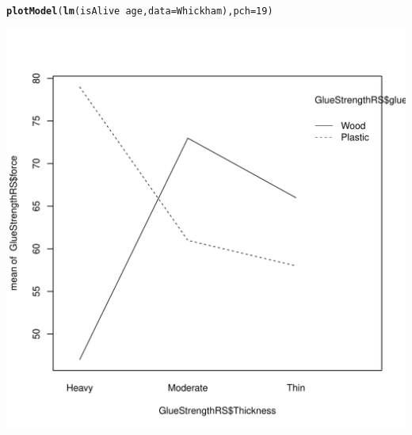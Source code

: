\documentclass[10pt]{article}\usepackage[]{graphicx}\usepackage[]{color}
\makeatletter
\def\maxwidth{ %
  \ifdim\Gin@nat@width>\linewidth
    \linewidth
  \else
    \Gin@nat@width
  \fi
}
\newcommand{\hlnum}[1]{\textcolor[rgb]{0.686,0.059,0.569}{#1}}%
\newcommand{\hlopt}[1]{\textcolor[rgb]{0,0,0}{#1}}%
\newcommand{\hlstd}[1]{\textcolor[rgb]{0.345,0.345,0.345}{#1}}%
\newcommand{\hlkwc}[1]{\textcolor[rgb]{0.333,0.667,0.333}{#1}}%
\newcommand{\hlkwd}[1]{\textcolor[rgb]{0.737,0.353,0.396}{\textbf{#1}}}%
\newenvironment{kframe}{%
 \def\at@end@of@kframe{}%
 \ifinner\ifhmode%
  \def\at@end@of@kframe{\end{minipage}}%
  \begin{minipage}{\columnwidth}%
 \fi\fi%
 \def\FrameCommand##1{\hskip\@totalleftmargin \hskip-\fboxsep
 \colorbox{shadecolor}{##1}\hskip-\fboxsep
     \hskip-\linewidth \hskip-\@totalleftmargin \hskip\columnwidth}%
 \MakeFramed {\advance\hsize-\width
   \@totalleftmargin\z@ \linewidth\hsize
   \@setminipage}}%
 {\par\unskip\endMakeFramed%
 \at@end@of@kframe}
\newenvironment{knitrout}{}{} %
\makeatother
\begin{document}
\begin{knitrout}\footnotesize
{}\color{fgcolor}\begin{kframe}
\begin{alltt}
\hlkwd{plotModel}\hlstd{(}\hlkwd{lm}\hlstd{(isAlive}\hlopt{~}\hlstd{age,} \hlkwc{data}\hlstd{=Whickham),} \hlkwc{pch}\hlstd{=}\hlnum{19}\hlstd{)}
\end{alltt}
\end{kframe}
\includegraphics[width=\maxwidth]{figure/unnamed-chunk-3-1} 

\end{knitrout}
\end{document}
